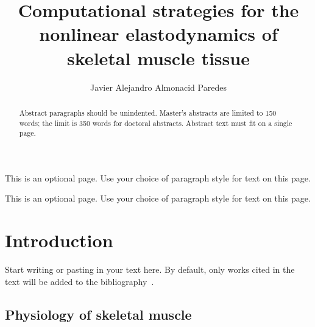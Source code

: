 \documentclass{sfuthesis}
\title{Computational strategies for the nonlinear elastodynamics of skeletal muscle tissue}
\author{Javier Alejandro Almonacid Paredes}
\numberwithin{equation}{chapter}
\numberwithin{figure}{chapter}
\numberwithin{table}{chapter}
\theoremstyle{definition}
\begin{document}
\frontmatter
\maketitle{}
\makecommittee{}


\begin{abstract}
Abstract paragraphs should be unindented. Master's abstracts are limited to 150 words; the limit is 350 words for doctoral abstracts. Abstract text must fit on a single page.
\end{abstract}


\begin{dedication}
This is an optional page. Use your choice of paragraph style for text on this page.
\end{dedication}


\begin{acknowledgements}
This is an optional page. Use your choice of paragraph style for text on this page.
\end{acknowledgements}

%
\hypersetup{linkbordercolor=black,hidelinks}
\tableofcontents%
\clearpage

%
\listoftables%
\clearpage

%
\listoffigures%
\clearpage





%
%

\mainmatter%

\chapter{Introduction}

Start writing or pasting in your text here. By default, only works cited in the text will be added to the bibliography~\cite{HolzapfelBook}.

\section{Physiology of skeletal muscle}
\end{document}
